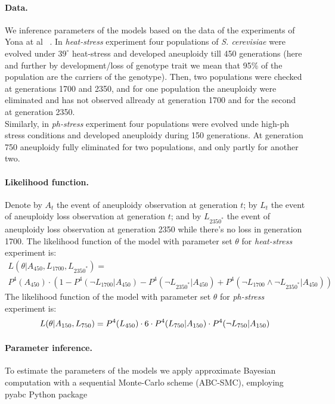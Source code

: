 \documentclass[12pt]{extarticle}
\begin{document}
\paragraph{Data.} We inference parameters of the models based on the data of the experiments of Yona at al ~\cite{Yona2012}. In \emph{heat-stress} experiment four populations of \emph{S. cerevisiae} were evolved under $39^{\circ}$ heat-stress and developed aneuploidy till 450 generations (here and further by development/loss of genotype trait we mean that 95\% of the population are the carriers of the genotype). Then, two populations were checked at generations 1700 and 2350, and for one population the aneuploidy were eliminated and has not observed allready at generation 1700 and for the second at generation 2350. \\
Similarly, in \emph{ph-stress} experiment four populations were evolved unde high-ph stress conditions and developed aneuploidy during 150 generations. At generation 750 aneuploidy fully eliminated for two populations, and only partly for another two. 

\paragraph{Likelihood function.}
Denote by $A_{t}$ the event of aneuploidy observation at generation $t$; by $L_{t}$ the event of aneuploidy loss observation at generation $t$; and by $L_{2350^*}$ the event of aneuploidy loss observation at generation 2350 while there's no loss in generation 1700. The likelihood function of the model with parameter set $\theta$ for \emph{heat-stress} experiment is:
\begin{multline} \label{eq:heatstress-likelihood}
L(\theta | A_{450}, L_{1700}, L_{2350^*} ) = \\
P^4(A_{450}) \cdot (1 - P^4(\lnot{L_{1700}} | A_{450} ) - P^4(\lnot{L_{2350^*}}| A_{450}) + P^4(\lnot{L_{1700}} \land \lnot{L_{2350^*}}| A_{450}) )		
\end{multline}
The likelihood function of the model with parameter set $\theta$ for \emph{ph-stress} experiment is:
\begin{equation} \label{eq:phstress-likelihood}
 L(\theta | A_{150}, L_{750} ) = \\
 P^4(L_{450}) \cdot 6 \cdot	P^4(L_{750} | A_{150}) \cdot P^4(\lnot{L_{750}} | A_{150})
\end{equation} 

\paragraph{Parameter inference.} To estimate the parameters of the models we apply approximate Bayesian computation with a sequential Monte-Carlo scheme (ABC-SMC), employing pyabc Python 
package \citep{Klinger2018}
\end{document}
